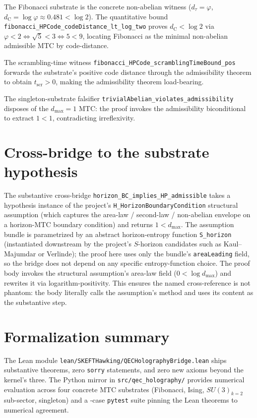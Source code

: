 \documentclass[twocolumn]{revtex4-2}
\newcommand{\dC}{d_{\mathrm{C}}}
\newcommand{\dmax}{d_{\max}}
\newcommand{\Tscr}{t_{\mathrm{scr}}}
\begin{document}
The Fibonacci substrate is the concrete non-abelian witness
($d_\tau = \varphi$, $\dC = \log\varphi \approx 0.481 < \log 2$).
The quantitative bound \texttt{fibonacci\_HPCode\_codeDistance\_lt\_log\_two}
proves $\dC < \log 2$ via $\varphi < 2 \Leftrightarrow \sqrt{5} < 3
\Leftrightarrow 5 < 9$, locating Fibonacci as the minimal
non-abelian admissible MTC by code-distance.

The scrambling-time witness
\texttt{fibonacci\_HPCode\_scramblingTimeBound\_pos} forwards the
substrate's positive code distance through the admissibility
theorem to obtain $\Tscr > 0$, making the admissibility theorem
load-bearing.

The singleton-substrate falsifier
\texttt{trivialAbelian\_violates\_admissibility} disposes of the
$\dmax = 1$ MTC: the proof invokes the admissibility biconditional
to extract $1 < 1$, contradicting irreflexivity.

\section{Cross-bridge to the substrate hypothesis}
\label{sec:bridge}

The substantive cross-bridge
\texttt{horizon\_BC\_implies\_HP\_admissible} takes a hypothesis
instance of the project's
\texttt{H\_HorizonBoundaryCondition} structural assumption (which
captures the area-law / second-law / non-abelian envelope on a
horizon-MTC boundary condition) and returns $1 < \dmax$. The
assumption bundle is parametrized by an abstract horizon-entropy
function \texttt{S\_horizon} (instantiated downstream by the
project's $S$-horizon candidates such as Kaul--Majumdar or
Verlinde); the proof here uses only the bundle's
\verb|areaLeading| field, so the bridge does not depend on any
specific entropy-function choice. The proof
body invokes the structural assumption's area-law field
($0 < \log\dmax$) and rewrites it via logarithm-positivity. This
ensures the named cross-reference is not phantom: the body literally
calls the assumption's method and uses its content as the substantive
step.

\section{Formalization summary}
\label{sec:formalization}

The Lean module
\texttt{lean/SKEFTHawking/QECHolographyBridge.lean}
ships \qecHolographyThms{} substantive theorems, zero \texttt{sorry} statements, and
zero new axioms beyond the kernel's three. The Python mirror in
\texttt{src/qec\_holography/} provides numerical evaluation across
four concrete MTC substrates (Fibonacci, Ising, $SU(3)_{k=2}$
sub-sector, singleton) and a \qecHolographyTests{}-case \texttt{pytest} suite pinning
the Lean theorems to numerical agreement.
\end{document}
